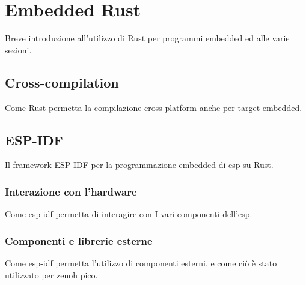 \chapter{Embedded Rust}
\label{chap:embedded-rust}

Breve introduzione all'utilizzo di Rust per programmi embedded ed alle varie
sezioni.

\section{Cross-compilation}
\label{sec:cross-compilation}

Come Rust permetta la compilazione cross-platform anche per target embedded.

\section{ESP-IDF}
\label{sec:esp-idf}

Il framework ESP-IDF per la programmazione embedded di esp su Rust.

\subsection{Interazione con l'hardware}
\label{sec:hardware-interaction}

Come esp-idf permetta di interagire con I vari componenti dell'esp.

\subsection{Componenti e librerie esterne}
\label{sec:components-and-external-libraries}

Come esp-idf permetta l'utilizzo di componenti esterni, e come ciò è stato
utilizzato per zenoh pico.
